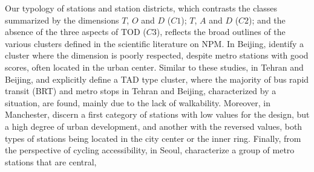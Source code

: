 \begin{refsegment}
Our typology of stations and station districts, which contrasts the classes summarized by the dimensions \(T\), \(O\) and \(D\) (\(C1\)); \(T\), \(A\) and \(D\) (\(C2\)); and the absence of the three aspects of \acrshort{TOD} (\(C3\)), reflects the broad outlines of the various clusters defined in the scientific literature on \acrshort{NPM}. In Beijing, \textcolor{blue}{\textcite[45]{lyu_developing_2016}} identify a cluster where the  dimension is poorly respected, despite metro stations with good scores, often located in the urban center. Similar to these studies, in Tehran and Beijing, \textcolor{blue}{\textcite[5]{pezeshknejad_evaluating_2020}} and \textcolor{blue}{\textcite[9]{liao_evaluating_2022}} explicitly define a \acrshort{TAD} type cluster, where the majority of bus rapid transit (BRT) and metro stops in Tehran and Beijing, characterized by a  situation, are found, mainly due to the lack of walkability. Moreover, in Manchester, \textcolor{blue}{\textcite[6]{zheng_classifying_2023}} discern a first category of stations with low values for the design, but a high degree of urban development, and another with the reversed values, both types of stations being located in the city center or the inner ring. Finally, from the perspective of cycling accessibility, in Seoul, \textcolor{blue}{\textcite[10]{rodriguez_typology_2020}} characterize a group of metro stations that are central, %


\end{refsegment}
